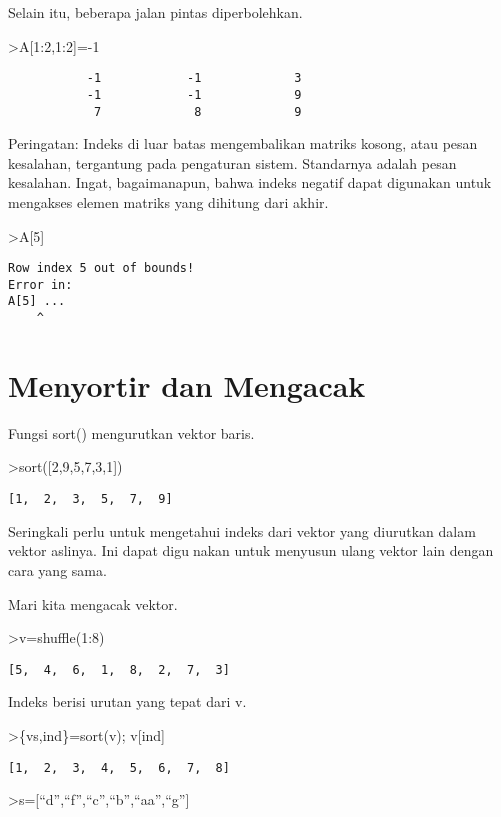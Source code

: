 \documentclass[
]{book}
\begin{document}
Selain itu, beberapa jalan pintas diperbolehkan.

\textgreater A{[}1:2,1:2{]}=-1

\begin{verbatim}
           -1            -1             3 
           -1            -1             9 
            7             8             9 
\end{verbatim}

Peringatan: Indeks di luar batas mengembalikan matriks kosong, atau pesan kesalahan, tergantung pada pengaturan sistem. Standarnya adalah pesan kesalahan. Ingat, bagaimanapun, bahwa indeks negatif dapat digunakan untuk mengakses elemen matriks yang dihitung dari akhir.

\textgreater A{[}5{]}

\begin{verbatim}
Row index 5 out of bounds!
Error in:
A[5] ...
    ^
\end{verbatim}

\section{Menyortir dan Mengacak}\label{menyortir-dan-mengacak}

Fungsi sort() mengurutkan vektor baris.

\textgreater sort({[}2,9,5,7,3,1{]})

\begin{verbatim}
[1,  2,  3,  5,  7,  9]
\end{verbatim}

Seringkali perlu untuk mengetahui indeks dari vektor yang diurutkan dalam vektor aslinya. Ini dapat digunakan untuk menyusun ulang vektor lain dengan cara yang sama.

Mari kita mengacak vektor.

\textgreater v=shuffle(1:8)

\begin{verbatim}
[5,  4,  6,  1,  8,  2,  7,  3]
\end{verbatim}

Indeks berisi urutan yang tepat dari v.

\textgreater\{vs,ind\}=sort(v); v{[}ind{]}

\begin{verbatim}
[1,  2,  3,  4,  5,  6,  7,  8]
\end{verbatim}

\textgreater s={[}``d'',``f'',``c'',``b'',``aa'',``g''{]}
\end{document}
